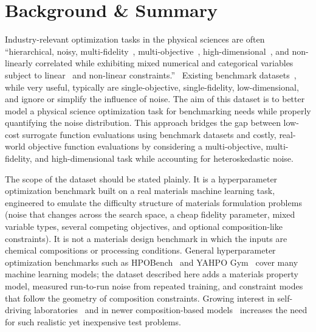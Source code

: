 \documentclass[pdflatex,sn-mathphys-num]{sn-jnl}
\begin{document}

\maketitle

\section{Background \& Summary}\label{sec:background}

Industry-relevant optimization tasks in the physical sciences are often ``hierarchical, noisy, multi-fidelity~\cite{Existing01_Ghoreishi2019,Existing02_Kandasamy2020_Dragonfly,SabanzaGil2025_MFBO,Gantzler2023_MFBO_COF}, multi-objective~\cite{Existing03_Hanaoka2022,Existing04_Hase2018_Chimera,Ament2023_LogEI}, high-dimensional~\cite{Existing05_Baird2022_CrabNet,Existing06_Eriksson2021_SAASBO,Hvarfner2024_VanillaBO,Papenmeier2023_Bounce}, and non-linearly correlated while exhibiting mixed numerical and categorical variables subject to linear~\cite{Existing07_09_Baird2023_Compactness} and non-linear constraints.''~\cite{Existing07_09_Baird2023_Compactness,Existing08_Baird2023_HardSphere,Hickman2025_Anubis} Existing benchmark datasets~\cite{Existing10_Dunn2020_Matbench,Existing11_DeBreuck2021_MODNet,Existing12_Wang2022_ActiveLearning,Existing13_Liang2021_BO_Benchmarks,Existing14_Henderson2021,Existing15_Hase2021_Olympus,Choudhary2024_JARVIS,Hickman2025_Atlas}, while very useful, typically are single-objective, single-fidelity, low-dimensional, and ignore or simplify the influence of noise. The aim of this dataset is to better model a physical science optimization task for benchmarking needs while properly quantifying the noise distribution. This approach bridges the gap between low-cost surrogate function evaluations using benchmark datasets and costly, real-world objective function evaluations by considering a multi-objective, multi-fidelity, and high-dimensional task while accounting for heteroskedastic noise.

The scope of the dataset should be stated plainly. It is a hyperparameter optimization benchmark built on a real materials machine learning task, engineered to emulate the difficulty structure of materials formulation problems (noise that changes across the search space, a cheap fidelity parameter, mixed variable types, several competing objectives, and optional composition-like constraints). It is not a materials design benchmark in which the inputs are chemical compositions or processing conditions. General hyperparameter optimization benchmarks such as HPOBench~\cite{Eggensperger2021_HPOBench} and YAHPO Gym~\cite{Pfisterer2022_YAHPOGym} cover many machine learning models; the dataset described here adds a materials property model, measured run-to-run noise from repeated training, and constraint modes that follow the geometry of composition constraints. Growing interest in self-driving laboratories~\cite{Tom2024_SDL_Review,Abolhasani2023_SDL} and in newer composition-based models~\cite{Madani2025_TransformerGraph} increases the need for such realistic yet inexpensive test problems.
\end{document}
